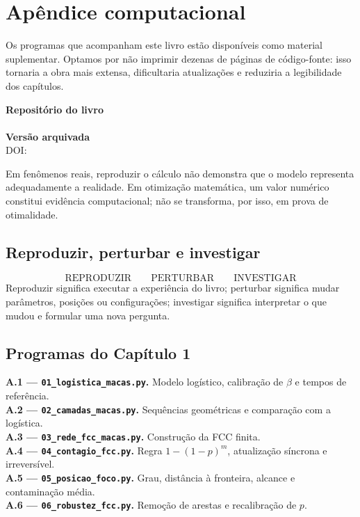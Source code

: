 \chapter{Apêndice computacional}
\label{ap:computacional}

Os programas que acompanham este livro estão disponíveis como material suplementar. Optamos por não imprimir dezenas de páginas de código-fonte: isso tornaria a obra mais extensa, dificultaria atualizações e reduziria a legibilidade dos capítulos.

\begin{center}
\textbf{Repositório do livro}\\[1mm]
\texttt{\RepositorioLivro}\\[2mm]
\textbf{Versão arquivada}\\[1mm]
DOI: \texttt{\DOICodigo}
\end{center}

\begin{validacao}
Em fenômenos reais, reproduzir o cálculo não demonstra que o modelo representa adequadamente a realidade. Em otimização matemática, um valor numérico constitui evidência computacional; não se transforma, por isso, em prova de otimalidade.
\end{validacao}

\section{Reproduzir, perturbar e investigar}
\[
\boxed{\text{REPRODUZIR}\qquad\text{PERTURBAR}\qquad\text{INVESTIGAR}}
\]
Reproduzir significa executar a experiência do livro; perturbar significa mudar parâmetros, posições ou configurações; investigar significa interpretar o que mudou e formular uma nova pergunta.

\section{Programas do Capítulo 1}
\textbf{A.1 — \texttt{01\_logistica\_macas.py}.} Modelo logístico, calibração de $\beta$ e tempos de referência.\\
\textbf{A.2 — \texttt{02\_camadas\_macas.py}.} Sequências geométricas e comparação com a logística.\\
\textbf{A.3 — \texttt{03\_rede\_fcc\_macas.py}.} Construção da FCC finita.\\
\textbf{A.4 — \texttt{04\_contagio\_fcc.py}.} Regra $1-(1-p)^m$, atualização síncrona e irreversível.\\
\textbf{A.5 — \texttt{05\_posicao\_foco.py}.} Grau, distância à fronteira, alcance e contaminação média.\\
\textbf{A.6 — \texttt{06\_robustez\_fcc.py}.} Remoção de arestas e recalibração de $p$.

